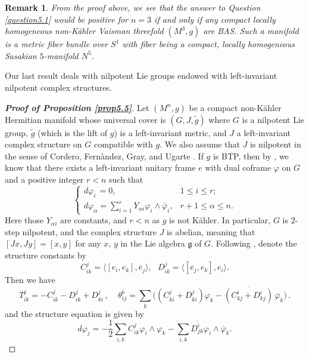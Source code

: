 \documentclass{amsart}
\numberwithin{equation}{section}
\newtheorem{remark}  [theorem]     {Remark}
\theoremstyle{definition}
\renewcommand{\1}{\mathds{1}}
\renewcommand{\>}{\rightarrow}
\begin{document}
\begin{remark}
From the proof above, we see that the answer to Question \ref{question5.1} would be positive for $n=3$ if and only if any compact locally homogeneous non-K\"ahler Vaisman threefold $(M^3,g)$ are {\rm BAS}. Such a manifold is a metric fiber bundle over $S^1$ with fiber being a compact, locally homogeneous Sasakian $5$-manifold $N^5$.
\end{remark}
 Our last result deals with nilpotent Lie groups endowed with left-invariant nilpotent complex structures.
\begin{proof}[{\bf Proof of Proposition \ref{prop5.5}}]
Let $(M^n,g)$ be a compact non-K\"ahler Hermitian manifold whose universal cover is $(G,J,\tilde{g})$ where $G$ is a nilpotent Lie group, $\tilde{g}$ (which is the lift of $g$) is  a left-invariant metric,  and $J$ a left-invariant complex structure on $G$ compatible with $g$. We also assume that $J$ is nilpotent in the sense of Cordero, Fern\`andez, Gray, and Ugarte \cite{CFGU}. If $g$ is {\rm BTP}, then by \cite[Proposition 4.4]{ZhaoZ22}, we know that there exists a left-invariant unitary frame $e$ with dual coframe $\varphi$ on $G$ and a positive integer $r<n$ such that
\begin{equation}  \label{eq:5.2}
\left\{ \begin{array} {ll}
  d\varphi_i \,  = 0, & 1\leq i\leq r; \\
  d\varphi_{\alpha} = \sum_{i=1}^r Y_{\alpha i} \varphi_i \wedge \overline{\varphi}_i, & r+1\leq \alpha \leq n.
 \end{array}  \right.
\end{equation}
Here those $Y_{\alpha i}$ are constants, and $r<n$ as $g$ is not K\"ahler. In particular, $G$ is $2$-step nilpotent, and the complex structure $J$ is abelian, meaning that $[Jx,Jy] =[x,y]$ for any $x$, $y$ in the Lie algebra ${\mathfrak g}$ of $G$. Following \cite{VYZ}, denote the structure constants by
$$ C^j_{ik} = \langle [e_i,e_k],\overline{e}_j\rangle, \ \ \ D^j_{ik} = \langle [\overline{e}_j,e_k],e_i\rangle . $$
Then we have
\begin{equation*}
 T^j_{ik} = - C^j_{ik} - D^j_{ik} + D^j_{ki}\,, \ \ \ \ \
  \theta^b_{ij} = \sum_k \big( (C^j_{ki}+ D^j_{ki}) \varphi_k - \overline{(C^i_{kj}+ D^i_{kj})} \,\overline{ \varphi}_k  \big) \,.
 \end{equation*}
and the structure equation is given by
\begin{equation} \label{eq:5.3}
 d\varphi_j = -\frac{1}{2} \sum_{i,k} C^j_{ik} \varphi_i\wedge \varphi_k - \sum_{i,k} \overline{D^i_{jk}} \varphi_i \wedge \overline{\varphi}_k.

\end{equation}
\end{proof}
\end{document}
